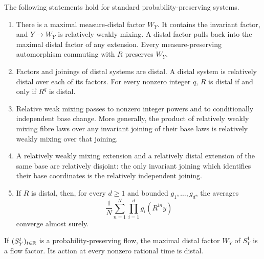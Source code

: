 \begin{proposition}\label{prop:structure}
The following statements hold for standard probability-preserving
systems.
\begin{enumerate}
\item There is a maximal measure-distal factor $W_Y$.  It contains the
invariant factor, and $Y\to W_Y$ is relatively weakly mixing.  A distal
factor pulls back into the maximal distal factor of any extension.
Every measure-preserving automorphism commuting with $R$ preserves
$W_Y$.
\item Factors and joinings of distal systems are distal.  A distal
system is relatively distal over each of its factors.  For every
nonzero integer $q$, $R$ is distal if and only if $R^q$ is distal.
\item Relative weak mixing passes to nonzero integer powers and to
conditionally independent base change.  More generally, the product
of relatively weakly mixing fibre laws over any invariant joining of
their base laws is relatively weakly mixing over that joining.
\item A relatively weakly mixing extension and a relatively distal
extension of the same base are relatively disjoint: the only invariant
joining which identifies their base coordinates is the relatively
independent joining.
\item If $R$ is distal, then, for every $d\ge1$ and bounded
$g_1,\ldots,g_d$, the averages
\[
 \frac1N\sum_{n=1}^N\prod_{i=1}^d g_i(R^{in}y)
\]
converge almost surely.
\end{enumerate}
If $(S_Y^t)_{t\in\mathbb R}$ is a probability-preserving flow, the maximal
distal factor $W_Y$ of $S_Y^1$ is a flow factor.  Its action at every
nonzero rational time is distal.
\end{proposition}

